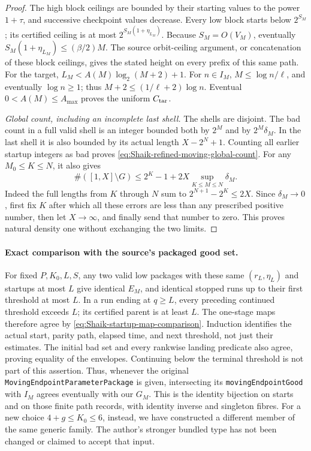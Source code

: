 \begin{proof}
The high block ceilings are bounded by their starting values to the
power \(1+\tau\), and successive checkpoint values decrease.
Every low block starts below \(2^{S_M}\); its certified ceiling is
at most \(2^{S_M(1+\eta_{L_M})}\). Because
\(S_M=O(V_M)\), eventually
\(S_M(1+\eta_{L_M})\le(\beta/2)M\).
The source orbit-ceiling argument, or concatenation of these block
ceilings, gives the stated height on every prefix of this same path.
For the target, \(L_M<A(M)\log_2(M+2)+1\).
For \(n\in I_M\), \(M\le\log n/\ell\), and eventually \(\log n\ge1\);
thus \(M+2\le(1/\ell+2)\log n\).
Eventual \(0<A(M)\le A_{\max}\) proves the uniform \(C_{\rm tar}\).

\emph{Global count, including an incomplete last shell.}
The shells are disjoint. The bad count in a full valid shell is an
integer bounded both by \(2^M\) and by \(2^M\delta_M\). In the last
shell it is also bounded by its actual length \(X-2^N+1\).
Counting all earlier startup integers as bad proves
\eqref{eq:Shaik-refined-moving-global-count}.
For any \(M_0\le K\le N\), it also gives
\begin{equation}\label{eq:Shaik-moving-tail-sup}
 \#([1,X]\setminus G)
 \le 2^K-1+2X\sup_{K\le M\le N}\delta_M.
\end{equation}
Indeed the full lengths from \(K\) through \(N\) sum to
\(2^{N+1}-2^K\le2X\). Since \(\delta_M\to0\), first fix \(K\) after
which all these errors are less than any prescribed positive number,
then let \(X\to\infty\), and finally send that number to zero.
This proves natural density one without exchanging the two limits.
\end{proof}

\paragraph{Exact comparison with the source's packaged good set.}
For fixed \(P,K_0,L,S\), any two valid low packages with these same
\((r_L,\eta_L)\) and startups at most \(L\) give identical
\(E_M\), and identical stopped runs up to their first threshold at
most \(L\). In a run ending at \(q\ge L\), every preceding continued
threshold exceeds \(L\); its certified parent is at least \(L\).
The one-stage maps therefore agree by
\eqref{eq:Shaik-startup-map-comparison}. Induction identifies the
actual start, parity path, elapsed time, and next threshold, not just
their estimates. The initial bad set and every rankwise landing
predicate also agree, proving equality of the envelopes. Continuing
below the terminal threshold is not part of this assertion.
Thus, whenever the original
\texttt{MovingEndpointParameterPackage} is given, intersecting its
\texttt{movingEndpointGood} with \(I_M\) agrees eventually with our
\(G_M\). This is the identity bijection on starts and on those finite
path records, with identity inverse and singleton fibres.
For a new choice \(4+g\le K_0\le6\), instead, we have constructed a
different member of the same generic family. The author's stronger
bundled type has not been changed or claimed to accept that input.

